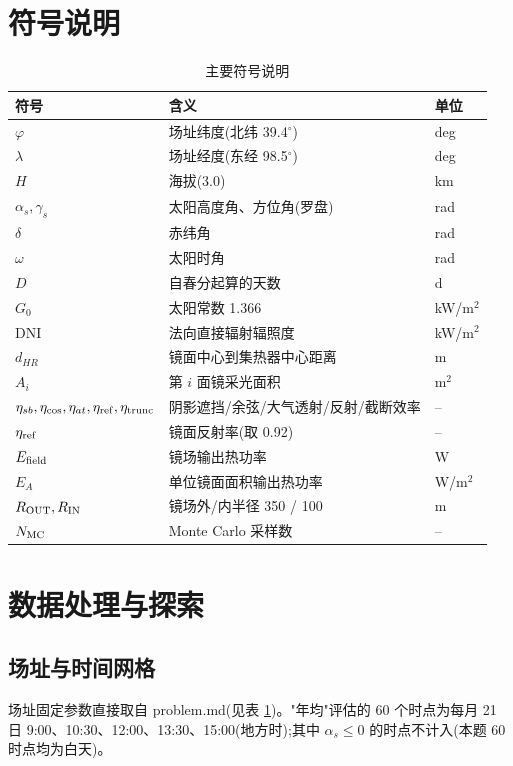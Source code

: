 \documentclass[UTF8,a4paper,12pt]{ctexart}
\begin{document}
\section{符号说明}
\begin{table}[H]
  \centering
  \caption{主要符号说明}
  \label{tab:notation}
  \begin{tabular}{lll}
    \toprule
    符号 & 含义 & 单位 \\
    \midrule
    $\varphi$ & 场址纬度(北纬 39.4$^\circ$) & deg \\
    $\lambda$ & 场址经度(东经 98.5$^\circ$) & deg \\
    $H$ & 海拔(3.0) & km \\
    $\alpha_s,\gamma_s$ & 太阳高度角、方位角(罗盘) & rad \\
    $\delta$ & 赤纬角 & rad \\
    $\omega$ & 太阳时角 & rad \\
    $D$ & 自春分起算的天数 & d \\
    $G_0$ & 太阳常数 1.366 & kW/m$^2$ \\
    $\mathrm{DNI}$ & 法向直接辐射辐照度 & kW/m$^2$ \\
    $d_{HR}$ & 镜面中心到集热器中心距离 & m \\
    $A_i$ & 第 $i$ 面镜采光面积 & m$^2$ \\
    $\eta_{sb},\eta_{\cos},\eta_{at},\eta_{\rm ref},\eta_{\rm trunc}$ & 阴影遮挡/余弦/大气透射/反射/截断效率 & -- \\
    $\eta_{\rm ref}$ & 镜面反射率(取 0.92) & -- \\
    $E_{\rm field}$ & 镜场输出热功率 & W \\
    $E_A$ & 单位镜面面积输出热功率 & W/m$^2$ \\
    $R_{\rm OUT},R_{\rm IN}$ & 镜场外/内半径 350 / 100 & m \\
    $N_{\rm MC}$ & Monte Carlo 采样数 & -- \\
    \bottomrule
  \end{tabular}
\end{table}

\section{数据处理与探索}
\label{sec:data}

\subsection{场址与时间网格}
场址固定参数直接取自 problem.md(见表 \ref{tab:notation})。"年均"评估的 60 个时点为每月 21 日 9:00、10:30、12:00、13:30、15:00(地方时);其中 $\alpha_s\le 0$ 的时点不计入(本题 60 时点均为白天)。
\end{document}
